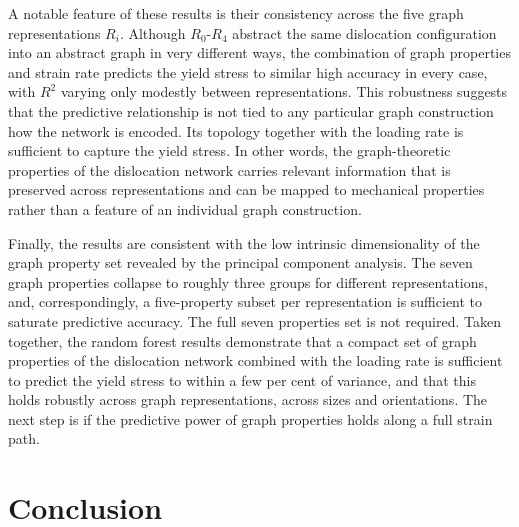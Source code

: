 \documentclass[pdflatex,sn-mathphys-num]{sn-jnl}%
\theoremstyle{thmstyleone}%
\theoremstyle{thmstyletwo}%
\theoremstyle{thmstylethree}%
\begin{document}
A notable feature of these results is their consistency across the five graph representations $R_i$.
Although $R_0$-$R_4$ abstract the same dislocation configuration into an abstract graph in very different ways, the combination of graph properties and strain rate predicts the yield stress to similar high accuracy in every case, with $R^2$ varying only modestly between representations.
This robustness suggests that the predictive relationship is not tied to any particular graph construction how the network is encoded.
Its topology together with the loading rate is sufficient to capture the yield stress.
In other words, the graph-theoretic properties of the dislocation network carries relevant information that is preserved across representations and can be mapped to mechanical properties rather than a feature of an individual graph construction.

Finally, the results are consistent with the low intrinsic dimensionality of the graph property set revealed by the principal component analysis.
The seven graph properties collapse to roughly three groups for different representations, and, correspondingly, a five-property subset per representation is sufficient to saturate predictive accuracy.
The full seven properties set is not required.
Taken together, the random forest results demonstrate that a compact set of graph properties of the dislocation network combined with the loading rate is sufficient to predict the yield stress to within a few per cent of variance, and that this holds robustly across graph representations, across sizes and orientations.
The next step is if the predictive power of graph properties holds along a full strain path.

\section{Conclusion}\label{sec:conclusion}
\end{document}
